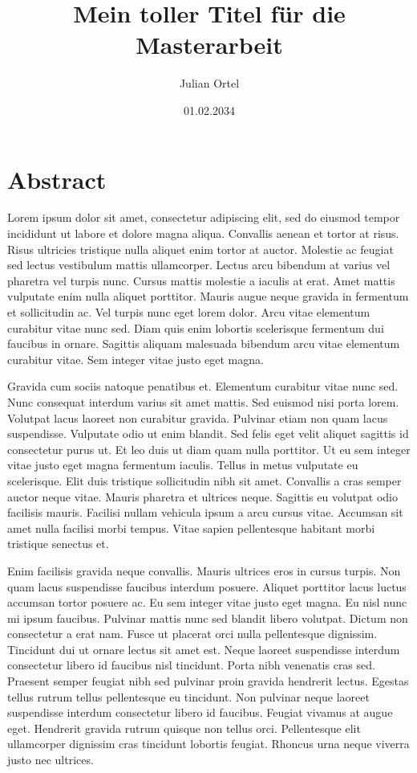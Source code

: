 \documentclass[
  11pt,
  a4paper,
  openright,
  cleardoublepage=plain,
  parskip=half+, %
]{scrreprt}
\title{Mein toller Titel für die Masterarbeit}
\author{Julian Ortel}
\date{01.02.2034}
\begin{document}




\tableofcontents
\newpage


\chapter*{Abstract}\label{abstract}

Lorem ipsum dolor sit amet, consectetur adipiscing elit, sed do eiusmod
tempor incididunt ut labore et dolore magna aliqua. Convallis aenean et
tortor at risus. Risus ultricies tristique nulla aliquet enim tortor at
auctor. Molestie ac feugiat sed lectus vestibulum mattis ullamcorper.
Lectus arcu bibendum at varius vel pharetra vel turpis nunc. Cursus
mattis molestie a iaculis at erat. Amet mattis vulputate enim nulla
aliquet porttitor. Mauris augue neque gravida in fermentum et
sollicitudin ac. Vel turpis nunc eget lorem dolor. Arcu vitae elementum
curabitur vitae nunc sed. Diam quis enim lobortis scelerisque fermentum
dui faucibus in ornare. Sagittis aliquam malesuada bibendum arcu vitae
elementum curabitur vitae. Sem integer vitae justo eget magna.

Gravida cum sociis natoque penatibus et. Elementum curabitur vitae nunc
sed. Nunc consequat interdum varius sit amet mattis. Sed euismod nisi
porta lorem. Volutpat lacus laoreet non curabitur gravida. Pulvinar
etiam non quam lacus suspendisse. Vulputate odio ut enim blandit. Sed
felis eget velit aliquet sagittis id consectetur purus ut. Et leo duis
ut diam quam nulla porttitor. Ut eu sem integer vitae justo eget magna
fermentum iaculis. Tellus in metus vulputate eu scelerisque. Elit duis
tristique sollicitudin nibh sit amet. Convallis a cras semper auctor
neque vitae. Mauris pharetra et ultrices neque. Sagittis eu volutpat
odio facilisis mauris. Facilisi nullam vehicula ipsum a arcu cursus
vitae. Accumsan sit amet nulla facilisi morbi tempus. Vitae sapien
pellentesque habitant morbi tristique senectus et.

Enim facilisis gravida neque convallis. Mauris ultrices eros in cursus
turpis. Non quam lacus suspendisse faucibus interdum posuere. Aliquet
porttitor lacus luctus accumsan tortor posuere ac. Eu sem integer vitae
justo eget magna. Eu nisl nunc mi ipsum faucibus. Pulvinar mattis nunc
sed blandit libero volutpat. Dictum non consectetur a erat nam. Fusce ut
placerat orci nulla pellentesque dignissim. Tincidunt dui ut ornare
lectus sit amet est. Neque laoreet suspendisse interdum consectetur
libero id faucibus nisl tincidunt. Porta nibh venenatis cras sed.
Praesent semper feugiat nibh sed pulvinar proin gravida hendrerit
lectus. Egestas tellus rutrum tellus pellentesque eu tincidunt. Non
pulvinar neque laoreet suspendisse interdum consectetur libero id
faucibus. Feugiat vivamus at augue eget. Hendrerit gravida rutrum
quisque non tellus orci. Pellentesque elit ullamcorper dignissim cras
tincidunt lobortis feugiat. Rhoncus urna neque viverra justo nec
ultrices.
\end{document}
